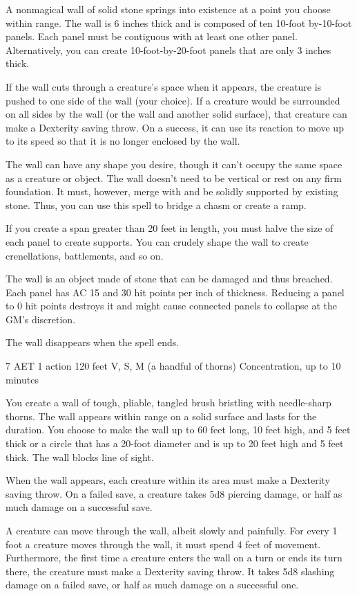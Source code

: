 A nonmagical wall of solid stone springs into existence at a point you choose within range. The wall is 6 inches thick and is composed of ten 10-foot by-10-foot panels. Each panel must be contiguous with at least one other panel. Alternatively, you can create 10-foot-by-20-foot panels that are only 3 inches thick.

If the wall cuts through a creature's space when it appears, the creature is pushed to one side of the wall (your choice). If a creature would be surrounded on all sides by the wall (or the wall and another solid surface), that creature can make a Dexterity saving throw. On a success, it can use its reaction to move up to its speed so that it is no longer enclosed by the wall.

The wall can have any shape you desire, though it can't occupy the same space as a creature or object. The wall doesn't need to be vertical or rest on any firm foundation. It must, however, merge with and be solidly supported by existing stone. Thus, you can use this spell to bridge a chasm or create a ramp.

If you create a span greater than 20 feet in length, you must halve the size of each panel to create supports. You can crudely shape the wall to create crenellations, battlements, and so on.

The wall is an object made of stone that can be damaged and thus breached. Each panel has AC 15 and 30 hit points per inch of thickness. Reducing a panel to 0 hit points destroys it and might cause connected panels to collapse at the GM's discretion.

The wall disappears when the spell ends.


{7 AET}
{1 action}
{120 feet}
{V, S, M (a handful of thorns)}
{Concentration, up to 10 minutes}

You create a wall of tough, pliable, tangled brush bristling with needle-sharp thorns. The wall appears within range on a solid surface and lasts for the duration. You choose to make the wall up to 60 feet long, 10 feet high, and 5 feet thick or a circle that has a 20-foot diameter and is up to 20 feet high and 5 feet thick. The wall blocks line of sight.

When the wall appears, each creature within its area must make a Dexterity saving throw. On a failed save, a creature takes 5d8 piercing damage, or half as much damage on a successful save.

A creature can move through the wall, albeit slowly and painfully. For every 1 foot a creature moves through the wall, it must spend 4 feet of movement. Furthermore, the first time a creature enters the wall on a turn or ends its turn there, the creature must make a Dexterity saving throw. It takes 5d8 slashing damage on a failed save, or half as much damage on a successful one.


